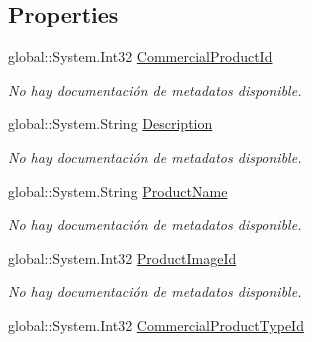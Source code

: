 \subsection*{Properties}
\begin{DoxyCompactItemize}
\item 
global\-::\-System.\-Int32 \hyperlink{class_microsoft_1_1_samples_1_1_kinect_1_1_basic_interactions_1_1_commercial_products_a926bace2d9ceb2a8a945bf1dcbf1597d}{Commercial\-Product\-Id}
\begin{DoxyCompactList}\small\item\em No hay documentación de metadatos disponible. \end{DoxyCompactList}\item 
global\-::\-System.\-String \hyperlink{class_microsoft_1_1_samples_1_1_kinect_1_1_basic_interactions_1_1_commercial_products_a2e719cb10bdae77c27c6e7ef6b572818}{Description}
\begin{DoxyCompactList}\small\item\em No hay documentación de metadatos disponible. \end{DoxyCompactList}\item 
global\-::\-System.\-String \hyperlink{class_microsoft_1_1_samples_1_1_kinect_1_1_basic_interactions_1_1_commercial_products_a9437e4954a7de4f49582d374a0864850}{Product\-Name}
\begin{DoxyCompactList}\small\item\em No hay documentación de metadatos disponible. \end{DoxyCompactList}\item 
global\-::\-System.\-Int32 \hyperlink{class_microsoft_1_1_samples_1_1_kinect_1_1_basic_interactions_1_1_commercial_products_af2cf8de4928260cd0259064e1cae6ccd}{Product\-Image\-Id}
\begin{DoxyCompactList}\small\item\em No hay documentación de metadatos disponible. \end{DoxyCompactList}\item 
global\-::\-System.\-Int32 \hyperlink{class_microsoft_1_1_samples_1_1_kinect_1_1_basic_interactions_1_1_commercial_products_a85eca2c130a48dbfaa0fe2c21cc56f40}{Commercial\-Product\-Type\-Id}

\end{DoxyCompactItemize}
